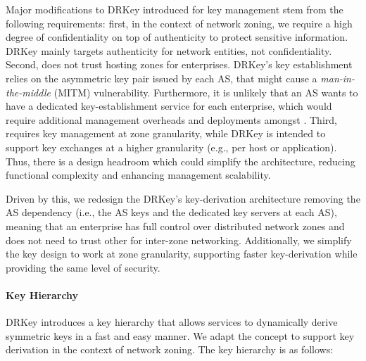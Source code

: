 Major modifications to DRKey introduced for \name key management stem from the following requirements: first,
in the context of network zoning, we require a high degree of confidentiality on top of
authenticity to protect sensitive information. DRKey mainly targets authenticity for
network entities, not confidentiality. Second, \name does not trust \ases hosting zones
for enterprises. DRKey's key establishment relies on the asymmetric key pair issued by
each AS, that might cause a \textit{man-in-the-middle} (MITM) vulnerability. Furthermore, it is unlikely that an AS
wants to have a dedicated key-establishment service for each enterprise, which would require
additional management overheads and deployments amongst \ases. Third, \name requires key
management at zone granularity, while DRKey is intended to support key exchanges at a
higher granularity (e.g., per host or application). Thus, there is a design headroom which
could simplify the architecture, reducing functional complexity and enhancing management
scalability.

Driven by this, we redesign the DRKey's key-derivation architecture removing the
AS dependency (i.e., the AS keys and the dedicated key servers at each AS), meaning
that an enterprise has full control over distributed network zones and does not
need to trust other \ases for inter-zone networking. Additionally, we simplify the key
design to work at zone granularity, supporting faster key-derivation while
providing the same level of security.

\paragraph{Key Hierarchy}
DRKey introduces a key hierarchy that allows services to dynamically derive symmetric
keys in a fast and easy manner. We adapt the concept to support key derivation in the
context of network zoning. The key hierarchy is as follows:

